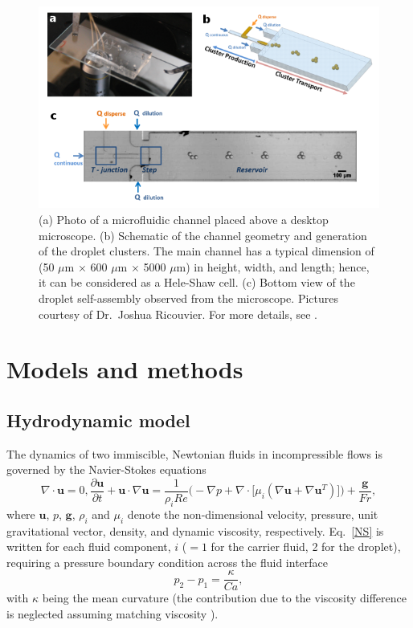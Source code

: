 \begin{figure}[t]
 \centering
 \includegraphics[width=0.9\columnwidth]{figs/microfluidic_channel.png}
 \caption{(a) Photo of a microfluidic channel placed above a desktop microscope. (b) Schematic of the channel geometry and generation of the droplet clusters. The main channel has a typical dimension of (50 $\mu$m $\times$ 600 $\mu$m $\times$ 5000 $\mu$m) in height, width, and length; hence, it can be considered as a Hele-Shaw cell. (c) Bottom view of the droplet self-assembly observed from the microscope. Pictures courtesy of Dr.\ Joshua Ricouvier. For more details, see   \cite{Shen_2016AS}.}
 \label{fig: chip}
\end{figure}


\section{Models and methods} \label{model}

\subsection{Hydrodynamic model}

The dynamics of two immiscible, Newtonian fluids in incompressible flows is governed by the Navier-Stokes equations
\begin{subequations}
 \begin{equation}
   \nabla \cdot {\bm u} = 0,
  \label{div free}
 \end{equation}
 \begin{equation}
      \frac{\partial {\bm u}}{\partial t} + {\bm u} \cdot \nabla {\bm u} = \frac{1}{\rho_iRe} \bigg(-\nabla p + \nabla \cdot \big[ \mu_i ( \nabla {\bm u} + \nabla {\bm u}^T ) \big] \bigg) + \frac{{\bm g}}{Fr},
  \label{NS}
 \end{equation}
\end{subequations}
where ${\bm u}$, $p$, $\bm{g}$, $\rho_i$ and $\mu_i$ denote the non-dimensional velocity, pressure, unit gravitational vector, density, and dynamic viscosity, respectively. Eq.\ \eqref{NS} is written for each fluid component, $i$ ($=1$ for the carrier fluid, 2 for the droplet), requiring a pressure boundary condition across the fluid interface
\begin{equation}
  p_2 - p_1 = \frac{\kappa}{Ca},
  \label{p laplace}
\end{equation}
with $\kappa$ being the mean curvature (the contribution due to the viscosity difference is neglected assuming matching viscosity \citep{Batchelor}).

